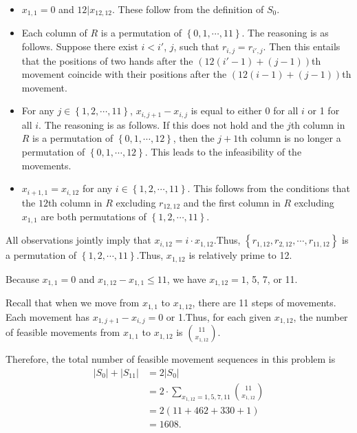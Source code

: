\begin{enumerate}
{{ 
            \begin{itemize}
        \item  $x_{1, 1} = 0$ and $12 | x_{12, 12}$. These follow from the definition of $S_0$.
        \item  Each column of $R$ is a permutation of $\left\{ 0, 1, \cdots , 11 \right\}$. The reasoning is as follows. Suppose there exist $i < i'$, $j$, such that $r_{i, j} = r_{i', j}$. Then this entails that the positions of two hands after the $\left( 12 \left( i' - 1 \right) + \left( j - 1 \right) \right)$th movement coincide with their positions after the  $\left( 12 \left( i - 1 \right) + \left( j - 1 \right) \right)$th movement.
        \item  For any $j \in \left\{ 1, 2 ,\cdots , 11 \right\}$, $x_{i, j+1} - x_{i, j}$ is equal to either 0 for all $i$ or 1 for all $i$.     The reasoning is as follows. If this does not hold and the $j$th column in $R$ is a permutation of $\left\{ 0, 1, \cdots , 12 \right\}$, then the $j+1$th column is no longer a permutation of $\left\{ 0, 1, \cdots , 12 \right\}$. This leads to the infeasibility of the movements.
        \item  $x_{i+1, 1} = x_{i, 12}$ for any $i \in \left\{ 1, 2, \cdots , 11 \right\}$. This follows from the conditions that the $12$th column in $R$ excluding $r_{12, 12}$ and the first column in $R$ excluding $x_{1, 1}$ are both permutations of $\left\{ 1, 2, \cdots , 11 \right\}$.
            \end{itemize}
            All observations jointly imply that $x_{i, 12} = i \cdot x_{1, 12}$.Thus, $\left\{ r_{1, 12}, r_{2, 12} , \cdots , r_{11, 12} \right\}$ is a permutation of $\left\{ 1, 2, \cdots , 11 \right\}$.Thus, $x_{1, 12}$ is relatively prime to 12.

 Because $x_{1, 1} = 0$ and $x_{1, 12} - x_{1, 1} \leq 11$, we have $x_{1, 12} = 1$, 5, 7, or 11.

 Recall that when we move from $x_{1, 1}$ to $x_{1, 12}$, there are 11 steps of movements. Each movement has $x_{1, j+1} - x_{i, j} = 0$ or 1.Thus, for each given $x_{1, 12}$, the number of feasible movements from $x_{1, 1}$ to $x_{1, 12}$ is $\binom{11}{x_{1, 12}}$.

 Therefore, the total number of feasible movement sequences in this problem is
 \begin{align*} | S_0 | + | S_{11} | & = 2 | S_0 | \\ & = 2 \cdot \sum_{x_{1, 12} = 1, 5, 7, 11} \binom{11}{x_{1, 12}} \\ & = 2 \left( 11 + 462 + 330 + 1 \right) \\ & = 1608 . \end{align*}


}}
\end{enumerate}

